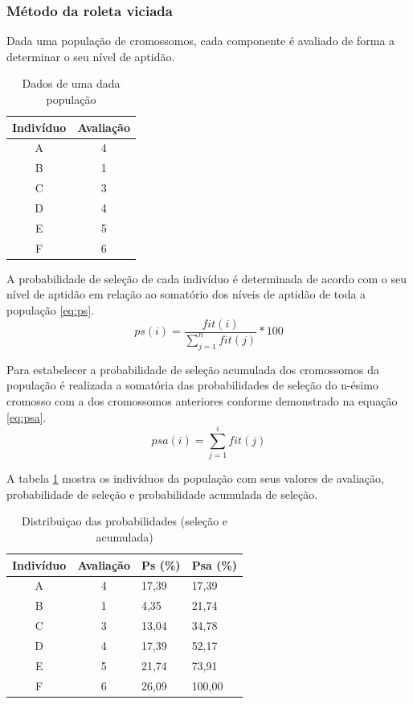 \documentclass[twoside]{article}
\begin{document}
\begin{multicols}{2}
\subsubsection{Método da roleta viciada}
Dada uma população de cromossomos, cada componente é avaliado de forma a determinar o seu nível de aptidão. 
\begin{table}[H]
\caption{Dados de uma dada população}
\centering
\begin{tabular}{cc}
\toprule
Indivíduo & Avaliação \\
\midrule
A & 4\\
B & 1\\
C & 3\\
D & 4\\
E & 5\\
F & 6\\
\bottomrule
\end{tabular}
\end{table}
A probabilidade de seleção de cada indivíduo é determinada de acordo com o seu nível de aptidão em relação ao somatório dos níveis de aptidão de toda a população \ref{eq:ps}. 
\begin{equation}
\label{eq:ps}
ps(i) = \frac {fit(i)}{\sum\limits_{j=1}^n fit(j)} * 100
\end{equation}

Para estabelecer a probabilidade de seleção acumulada dos cromossomos da população é realizada a somatória das probabilidades de seleção do n-ésimo cromosso com a dos cromossomos anteriores conforme demonstrado na equação \ref{eq:psa}.
\begin{equation}
\label{eq:psa}
psa(i) = \sum\limits_{j=1}^i fit(j)
\end{equation}

A tabela \ref{tab:popinfo} mostra os indivíduos da população com seus valores de avaliação, probabilidade de seleção e probabilidade acumulada de seleção.
\begin{table}[H]
\label{tab:popinfo}
\caption{Distribuiçao das probabilidades (seleção e acumulada)}
\centering
\begin{tabular}{ccll}
\toprule
Indivíduo & Avaliação & Ps (\%) & Psa (\%) \\
\midrule
A & 4 & 17,39 & 17,39\\
B & 1 & 4,35 & 21,74\\
C & 3 & 13,04 & 34,78\\
D & 4 & 17,39 & 52,17\\
E & 5 & 21,74 & 73,91\\
F & 6 & 26,09 & 100,00\\
\bottomrule
\end{tabular}
\end{table}


\end{multicols}
\end{document}
